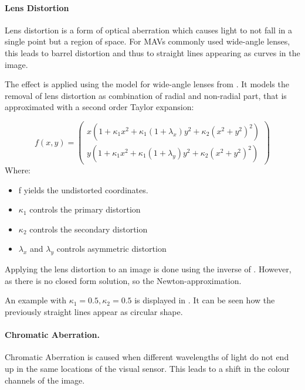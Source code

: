 \paragraph{Lens Distortion}

Lens distortion is a form of optical aberration which causes light to not fall in a single point but a region of space. For \acp{MAV} commonly used wide-angle lenses, this leads to barrel distortion and thus to straight lines appearing as curves in the image.

The effect is applied using the model for wide-angle lenses from \cite{Vass}. It models the removal of lens distortion as combination of radial and non-radial part, that is approximated with a second order Taylor expansion:

\begin{equation}
f(x,y) =
\begin{pmatrix}
x (1 + \kappa_1 x^2 + \kappa_1 (1 + \lambda_x) y^2 + \kappa_2(x^2 + y^2)^2) \\
y (1 + \kappa_1 x^2 + \kappa_1 (1 + \lambda_y) y^2 + \kappa_2(x^2 + y^2)^2)
\end{pmatrix} 
\label{eq:distortion}
\end{equation}
Where:
\begin{itemize}
	\item f yields the undistorted coordinates.
	\item $\kappa_1$ controls the primary distortion
	\item $\kappa_2$ controls the secondary distortion 
	\item $\lambda_x$ and $\lambda_y$ controls asymmetric distortion
\end{itemize}
 
Applying the lens distortion to an image is done using the inverse of . However, as there is no closed form solution, so the Newton-approximation.

An example with $\kappa_1 = 0.5, \kappa_2 = 0.5$ is displayed in . It can be seen how the previously straight lines appear as circular shape.

\paragraph{Chromatic Aberration.}

Chromatic Aberration is caused when different wavelengths of light do not end up in the same locations of the visual sensor. This leads to a shift in the colour channels of the image.

